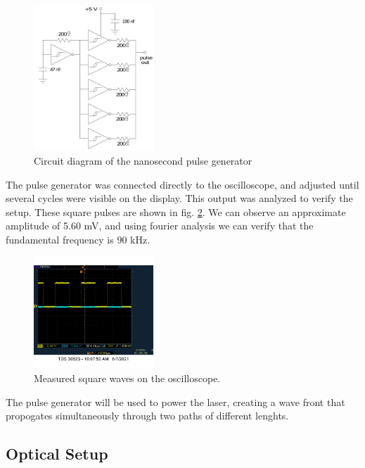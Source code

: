 \documentclass[aps,prl,reprint]{revtex4-2}
\begin{document}
\begin{figure}[h]
\includegraphics[width=0.4\textwidth]{./BMPs/Schmitt.jpg}
\caption{\label{Schmitt} Circuit diagram of the nanosecond pulse generator}
\end{figure}

The pulse generator was connected directly to the oscilloscope, and adjusted until
several cycles were visible on the display. This output was analyzed to verify the setup.
These square pulses are shown in fig. \ref{squares}. We can observe an approximate 
amplitude of 5.60 mV, and using fourier analysis we can verify that the fundamental 
frequency is 90 kHz. \\

\begin{figure}[h]
\includegraphics[width=0.4\textwidth]{./BMPs/l4_A_1.jpg}
\caption{\label{squares} Measured square waves on the oscilloscope.}
\end{figure}

The pulse generator will be used to power the laser, creating a wave
front that propogates simultaneously through two paths of different lenghts. \\


\subsection{Optical Setup}
\end{document}
